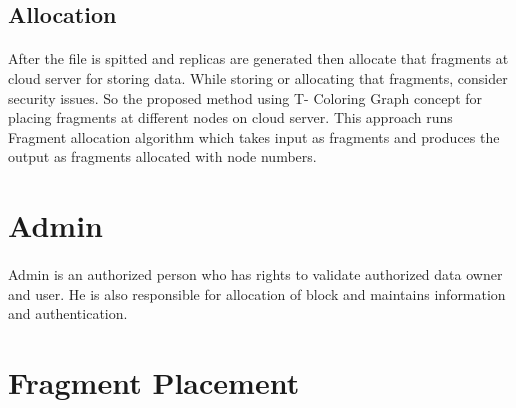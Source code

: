 \subsection{Allocation}
\paragraph*{}
After the file is spitted and replicas are generated then allocate that fragments at
cloud server for storing data. While storing or allocating that fragments, consider security
issues. So the proposed method using T- Coloring Graph concept for placing fragments
at different nodes on cloud server. This approach runs Fragment allocation algorithm
which takes input as fragments and produces the output as fragments allocated with node
numbers.

\section{Admin}
\paragraph*{} 
Admin is an authorized person who has rights to validate authorized data owner
and user. He is also responsible for allocation of block and maintains information and
authentication.
\section{Fragment Placement}
